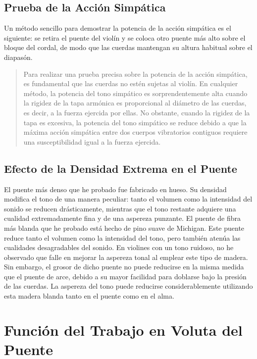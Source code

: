 \documentclass[12pt]{book}
\begin{document}
\subsection*{Prueba de la Acción Simpática}

Un método sencillo para demostrar la potencia de la acción simpática es el siguiente: se retira el puente del violín y se coloca otro puente más alto sobre el bloque del cordal, de modo que las cuerdas mantengan su altura habitual sobre el diapasón.

\begin{quote}
Para realizar una prueba precisa sobre la potencia de la acción simpática, es fundamental que las cuerdas no estén sujetas al violín. En cualquier método, la potencia del tono simpático es sorprendentemente alta cuando la rigidez de la tapa armónica es proporcional al diámetro de las cuerdas, es decir, a la fuerza ejercida por ellas. No obstante, cuando la rigidez de la tapa es excesiva, la potencia del tono simpático se reduce debido a que la máxima acción simpática entre dos cuerpos vibratorios contiguos requiere una susceptibilidad igual a la fuerza ejercida.
\end{quote}

\subsection*{Efecto de la Densidad Extrema en el Puente}

El puente más denso que he probado fue fabricado en hueso. Su densidad modifica el tono de una manera peculiar: tanto el volumen como la intensidad del sonido se reducen drásticamente, mientras que el tono restante adquiere una cualidad extremadamente fina y de una aspereza punzante.
El puente de fibra más blanda que he probado está hecho de pino suave de Michigan. Este puente reduce tanto el volumen como la intensidad del tono, pero también atenúa las cualidades desagradables del sonido. En violines con un tono ruidoso, no he observado que falle en mejorar la aspereza tonal al emplear este tipo de madera. Sin embargo, el grosor de dicho puente no puede reducirse en la misma medida que el puente de arce, debido a su mayor facilidad para doblarse bajo la presión de las cuerdas. La aspereza del tono puede reducirse considerablemente utilizando esta madera blanda tanto en el puente como en el alma.

\section*{Función del Trabajo en Voluta del Puente}
\end{document}
